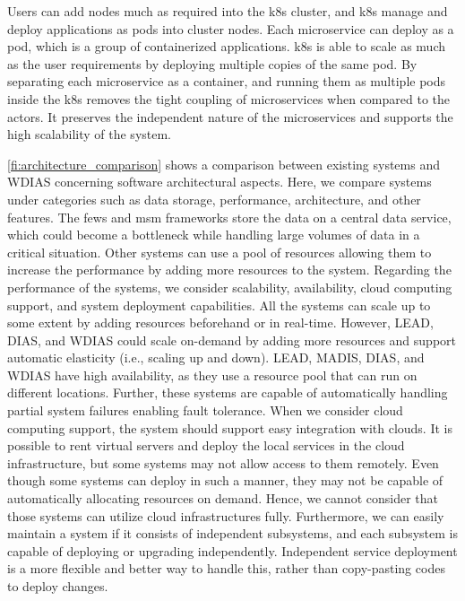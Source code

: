 Users can add nodes much as required into the \acrshort{k8s} cluster, and \acrshort{k8s} manage and deploy applications as pods into cluster nodes. Each microservice can deploy as a pod, which is a group of containerized applications. \acrshort{k8s} is able to scale as much as the user requirements by deploying multiple copies of the same pod. By separating each microservice as a container, and running them as multiple pods inside the \acrshort{k8s} removes the tight coupling of microservices when compared to the actors. It preserves the independent nature of the microservices and supports the high scalability of the system.


\cref{fi:architecture_comparison} shows a comparison between existing systems and WDIAS concerning software architectural aspects. Here, we compare systems under categories such as data storage, performance, architecture, and other features. The \acrshort{fews} and \acrshort{msm} frameworks store the data on a central data service, which could become a bottleneck while handling large volumes of data in a critical situation. Other systems can use a pool of resources allowing them to increase the performance by adding more resources to the system. Regarding the performance of the systems, we consider scalability, availability, cloud computing support, and system deployment capabilities. All the systems can scale up to some extent by adding resources beforehand or in real-time. However, LEAD, DIAS, and WDIAS could scale on-demand by adding more resources and support automatic elasticity (i.e., scaling up and down). LEAD, MADIS, DIAS, and WDIAS have high availability, as they use a resource pool that can run on different locations. Further, these systems are capable of automatically handling partial system failures enabling fault tolerance. When we consider cloud computing support, the system should support easy integration with clouds. It is possible to rent virtual servers and deploy the local services in the cloud infrastructure, but some systems may not allow access to them remotely. Even though some systems can deploy in such a manner, they may not be capable of automatically allocating resources on demand. Hence, we cannot consider that those systems can utilize cloud infrastructures fully. Furthermore, we can easily maintain a system if it consists of independent subsystems, and each subsystem is capable of deploying or upgrading independently. Independent service deployment is a more flexible and better way to handle this, rather than copy-pasting codes to deploy changes.

